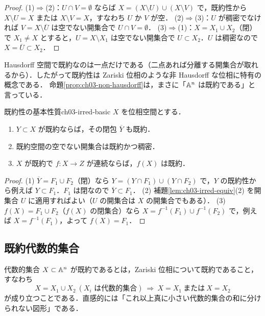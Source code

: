 \begin{proof}
(1)$\Rightarrow$(2)：$U\cap V=\emptyset$ ならば $X=(X\setminus U)\cup(X\setminus V)$ で，既約性から $X\setminus U=X$ または $X\setminus V=X$，すなわち $U$ か $V$ が空．
(2)$\Rightarrow$(3)：$U$ が稠密でなければ $V=X\setminus\overline U$ は空でない開集合で $U\cap V=\emptyset$．
(3)$\Rightarrow$(1)：$X=X_1\cup X_2$（閉）で $X_1\ne X$ とすると，$U=X\setminus X_1$ は空でない開集合で $U\subset X_2$．$U$ は稠密なので $X=\overline U\subset X_2$．
\end{proof}

Hausdorff 空間で既約なのは一点だけである（二点あれば分離する開集合が取れるから）．したがって既約性は Zariski 位相のような非 Hausdorff な位相に特有の概念である．
命題\ref{prop:ch03-non-hausdorff}は，まさに「$\mathbb{A}^n$ は既約である」と言っている．

\begin{mylem}{既約性の基本性質}{ch03-irred-basic}
$X$ を位相空間とする．
\begin{enumerate}
  \item $Y\subset X$ が既約ならば，その閉包 $\overline Y$ も既約．
  \item 既約空間の空でない開集合は既約かつ稠密．
  \item $X$ が既約で $f\colon X\to Z$ が連続ならば，$f(X)$ は既約．
\end{enumerate}
\end{mylem}

\begin{proof}
(1) $\overline Y=F_1\cup F_2$（閉）なら $Y=(Y\cap F_1)\cup(Y\cap F_2)$ で，$Y$ の既約性から例えば $Y\subset F_1$．$F_1$ は閉なので $\overline Y\subset F_1$．
(2) 補題\ref{lem:ch03-irred-equiv}(2) を開集合 $U$ に適用すればよい（$U$ の開集合は $X$ の開集合でもある）．
(3) $f(X)=F_1\cup F_2$（$f(X)$ の閉集合）なら $X=f^{-1}(F_1)\cup f^{-1}(F_2)$ で，例えば $X=f^{-1}(F_1)$，よって $f(X)=F_1$．
\end{proof}

\subsection{既約代数的集合}

代数的集合 $X\subset\mathbb{A}^n$ が既約であるとは，Zariski 位相について既約であること，すなわち
\[
  X=X_1\cup X_2\ (X_i\text{ は代数的集合})\ \Longrightarrow\ X=X_1\ \text{または}\ X=X_2
\]
が成り立つことである．直感的には「これ以上真に小さい代数的集合の和に分けられない図形」である．

